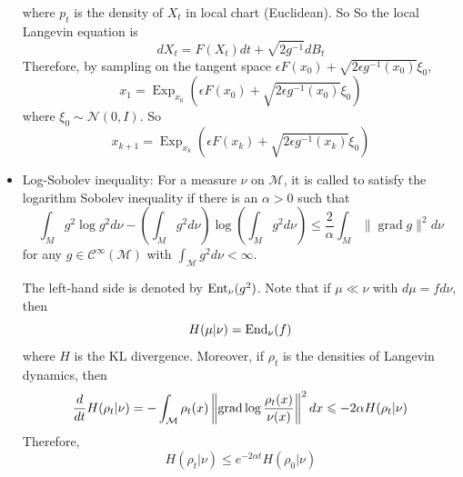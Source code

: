 \documentclass[a4paper,12pt]{article}
\begin{document}
\begin{itemize}
  where $p_t$ is the density of $X_t$ in local chart (Euclidean). So
  So the local Langevin equation is
  \begin{equation*}
    d X_t=F\left(X_t\right) d t+\sqrt{2 g^{-1}} d B_t
  \end{equation*}
  Therefore, by sampling on the tangent space $\epsilon F\left(x_0\right)+\sqrt{2 \epsilon g^{-1}\left(x_0\right)} \xi_0$, 
  \begin{equation*}
    x_1=\operatorname{Exp}_{x_0}\left(\epsilon F\left(x_0\right)+\sqrt{2 \epsilon g^{-1}\left(x_0\right)} \xi_0\right)
  \end{equation*}
  where $\xi_0 \sim \mathcal{N}(0, I)$. So 
  \begin{equation*}
    x_{k+1}=\operatorname{Exp}_{x_k}\left(\epsilon F\left(x_k\right)+\sqrt{2 \epsilon g^{-1}\left(x_k\right)} \xi_0\right)
  \end{equation*}

  \item Log-Sobolev inequality: For a measure $\nu$ on $\mathcal{M}$, it is called to satisfy the logarithm Sobolev inequality if there is an $\alpha > 0$ such that
  \begin{equation*}
    \int_M g^2 \log g^2 d \nu-\left(\int_M g^2 d \nu\right) \log \left(\int_M g^2 d \nu\right) \leq \frac{2}{\alpha} \int_M\|\operatorname{grad} g\|^2 d \nu
  \end{equation*}
  for any $g \in \mathcal{C}^\infty(\mathcal{M})$ with $\int_\mathcal{M}g^2 d\nu < \infty$.
  \begin{rmk}
    The left-hand side is denoted by $\operatorname{Ent}_\nu(g^2)$. Note that if $\mu \ll \nu$ with $d\mu = f d\nu$, then
    \begin{equation*}
      H(\mu \vert \nu) = \operatorname{End}_\nu(f)
    \end{equation*}
    where $H$ is the KL divergence. Moreover, if $\rho_t$ is the densities of Langevin dynamics, then
    \begin{equation*}
      \frac{d}{dt}H(\rho_t \vert \nu) = -\int_\mathcal{M} \rho_t(x)\left\lVert\operatorname{grad} \log \frac{\rho_t(x)}{\nu(x)}\right\lVert^2dx \leqslant -2\alpha H(\rho_t \vert \nu)
    \end{equation*}
    Therefore,
    \begin{equation*}
      H(\rho_t \vert \nu) \leqslant e^{-2\alpha t}H(\rho_0 \vert \nu)
    \end{equation*}
  \end{rmk}
\end{itemize}
\end{document}
